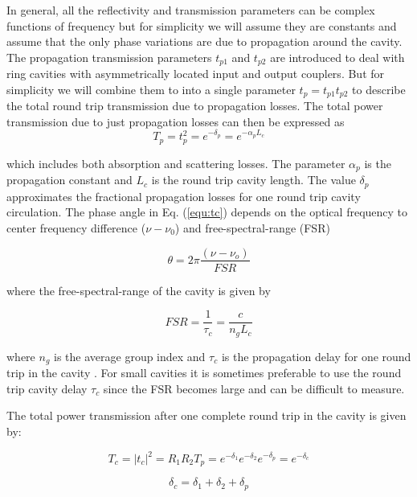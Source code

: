 \documentclass[10pt]{article}
\begin{document}
\noindent In general, all the reflectivity and transmission parameters can be complex functions of frequency but for  simplicity we will assume they are constants and assume that the only phase variations are due to propagation around the cavity. The propagation transmission parameters $t_{p1}$ and $t_{p2}$ are introduced to deal with ring cavities with asymmetrically located input and output couplers. But for simplicity we will combine them to into a single parameter $t_p = t_{p1} t_{p2}$ to describe the total round trip transmission due to  propagation losses.  The total power transmission due to just propagation losses can then be expressed as
\begin{equation}
T_p = t_p^2 = e^{-\delta_{p}}= e^{-\alpha_p L_c}  
\end{equation}

\noindent which includes both absorption and scattering losses. The parameter $\alpha_p$  is the propagation constant and $L_c$ is the round trip cavity length.    The value $\delta_{p}$  approximates the fractional propagation losses for one round trip cavity circulation.  The phase angle in Eq. (\ref{equ:tc}) depends on the optical frequency  to center frequency difference ($ \nu - \nu_0 $) and free-spectral-range (FSR)

\begin{equation} 
\theta = 2\pi \frac{(\nu - \nu_o)}{FSR}  
\end{equation}  

\noindent where the free-spectral-range of the cavity is given by

\begin{equation} 
FSR = \frac{1}{\tau_c}  = \frac{c}{n_g L_c}
\end{equation}  

\noindent   where  $n_g$ is the average group index and $\tau_c$ is the propagation delay for one round trip in the cavity \cite{Shi:07}. For small cavities it is sometimes preferable to use the round trip cavity delay $\tau_c$ since the FSR becomes large and can be difficult to measure. 

The total power transmission after one complete round trip in the cavity is given by:

\begin{equation}
  T_c = |t_c|^2 = R_1 R_2 T_p  = e^{-\delta_1} e^{-\delta_2} e^{-\delta_p} = e^{-\delta_c}
\end{equation}



\begin{equation} 
  \delta_c = \delta_1 + \delta_2 + \delta_p 
\end{equation} 
\end{document}
